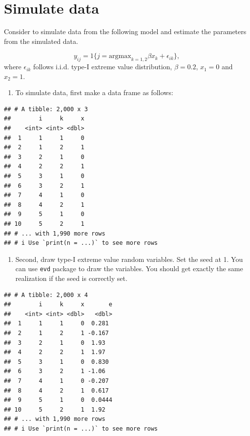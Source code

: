 \documentclass[
]{book}
\providecommand{\tightlist}{%
  \setlength{\itemsep}{0pt}\setlength{\parskip}{0pt}}
\begin{document}
\hypertarget{simulate-data}{%
\section{Simulate data}\label{simulate-data}}

Consider to simulate data from the following model and estimate the parameters from the simulated data.

\[
y_{ij} = 1\{j = \text{argmax}_{k = 1, 2} \beta x_k + \epsilon_{ik} \},
\]
where \(\epsilon_{ik}\) follows i.i.d. type-I extreme value distribution, \(\beta = 0.2\), \(x_1 = 0\) and \(x_2 = 1\).

\begin{enumerate}
\def\labelenumi{\arabic{enumi}.}
\tightlist
\item
  To simulate data, first make a data frame as follows:
\end{enumerate}

\begin{verbatim}
## # A tibble: 2,000 x 3
##        i     k     x
##    <int> <int> <dbl>
##  1     1     1     0
##  2     1     2     1
##  3     2     1     0
##  4     2     2     1
##  5     3     1     0
##  6     3     2     1
##  7     4     1     0
##  8     4     2     1
##  9     5     1     0
## 10     5     2     1
## # ... with 1,990 more rows
## # i Use `print(n = ...)` to see more rows
\end{verbatim}

\begin{enumerate}
\def\labelenumi{\arabic{enumi}.}
\setcounter{enumi}{1}
\tightlist
\item
  Second, draw type-I extreme value random variables. Set the seed at 1. You can use \texttt{evd} package to draw the variables. You should get exactly the same realization if the seed is correctly set.
\end{enumerate}

\begin{verbatim}
## # A tibble: 2,000 x 4
##        i     k     x       e
##    <int> <int> <dbl>   <dbl>
##  1     1     1     0  0.281 
##  2     1     2     1 -0.167 
##  3     2     1     0  1.93  
##  4     2     2     1  1.97  
##  5     3     1     0  0.830 
##  6     3     2     1 -1.06  
##  7     4     1     0 -0.207 
##  8     4     2     1  0.617 
##  9     5     1     0  0.0444
## 10     5     2     1  1.92  
## # ... with 1,990 more rows
## # i Use `print(n = ...)` to see more rows
\end{verbatim}
\end{document}
